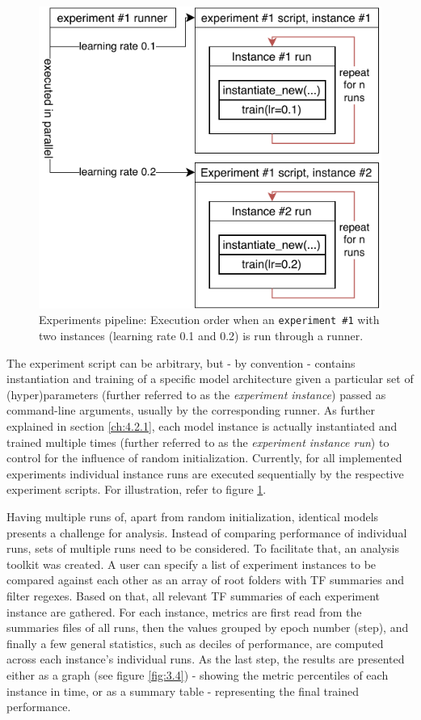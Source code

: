 \begin{figure}[ht]
    \centering
    \includegraphics[]{../figures/03_msc-neuro_1}
    \caption[Experiments pipeline]{Experiments pipeline: Execution order when an \texttt{experiment \#1} with two instances (learning rate 0.1 and 0.2) is run through a runner.}
    \label{fig:3.3}
\end{figure}

The experiment script can be arbitrary, but - by convention - contains instantiation and training of a specific model architecture given a particular set of (hyper)parameters (further referred to as the \textit{experiment instance}) passed as command-line arguments, usually by the corresponding runner. As further explained in section \ref{ch:4.2.1}, each model instance is actually instantiated and trained multiple times (further referred to as the \textit{experiment instance run}) to control for the influence of random initialization. Currently, for all implemented experiments individual instance runs are executed sequentially by the respective experiment scripts. For illustration, refer to figure \ref{fig:3.3}.

Having multiple runs of, apart from random initialization, identical models presents a challenge for analysis. Instead of comparing performance of individual runs, sets of multiple runs need to be considered. To facilitate that, an analysis toolkit was created. A user can specify a list of experiment instances to be compared against each other as an array of root folders with TF summaries and filter regexes. Based on that, all relevant TF summaries of each experiment instance are gathered. For each instance, metrics are first read from the summaries files of all runs, then the values grouped by epoch number (step), and finally a few general statistics, such as deciles of performance, are computed across each instance’s individual runs. As the last step, the results are presented either as a graph (see figure \ref{fig:3.4}) - showing the metric percentiles of each instance in time, or as a summary table - representing the final trained performance. 

